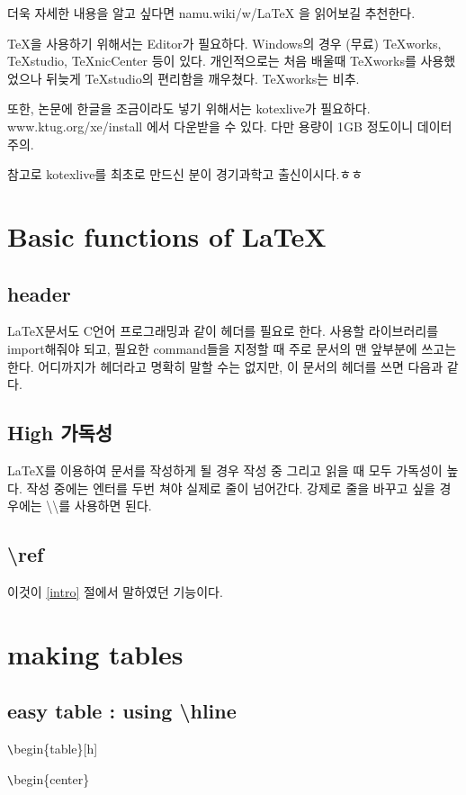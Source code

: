 \documentclass[11pt]{article}
\begin{document}
더욱 자세한 내용을 알고 싶다면 namu.wiki/w/LaTeX 을 읽어보길 추천한다.

TeX을 사용하기 위해서는 Editor가 필요하다.
Windows의 경우 (무료) TeXworks, TeXstudio, TeXnicCenter 등이 있다. 개인적으로는 처음 배울때 TeXworks를 사용했었으나 뒤늦게 TeXstudio의 편리함을 깨우쳤다. TeXworks는 비추.

또한, 논문에 한글을 조금이라도 넣기 위해서는 kotexlive가 필요하다. www.ktug.org/xe/install 에서 다운받을 수 있다. 다만 용량이 1GB 정도이니 데이터 주의.

참고로 kotexlive를 최초로 만드신 분이 경기과학고 출신이시다.ㅎㅎ 

\section{Basic functions of \LaTeX}
\subsection{header}
\LaTeX 문서도 C언어 프로그래밍과 같이 헤더를 필요로 한다. 사용할 라이브러리를 import해줘야 되고, 필요한 command들을 지정할 때 주로 문서의 맨 앞부분에 쓰고는 한다. 어디까지가 헤더라고 명확히 말할 수는 없지만, 이 문서의 헤더를 쓰면 다음과 같다.

\subsection{High 가독성}
\LaTeX 를 이용하여 문서를 작성하게 될 경우 작성 중 그리고 읽을 때 모두 가독성이 높다.
작성 중에는 엔터를 두번 쳐야 실제로 줄이 넘어간다. 강제로 줄을 바꾸고 싶을 경우에는 \textbackslash \textbackslash 를 사용하면 된다.

\subsection{\textbackslash ref}

이것이 \ref{intro} 절에서 말하였던 기능이다.

\section{making tables}
\subsection{easy table : using \textbackslash hline}

\verb+\+begin\{table\}[h]

\verb+\+begin\{center\}
\end{document}
